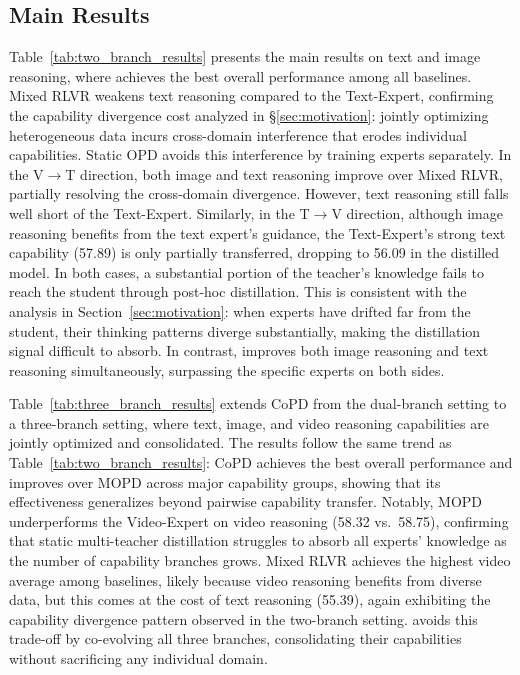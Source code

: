 \subsection{Main Results}
\label{sec:main_exps}

Table~\ref{tab:two_branch_results} presents the main results on text and image reasoning, where \method achieves the best overall performance among all baselines. Mixed RLVR weakens text reasoning compared to the Text-Expert, confirming the capability divergence cost analyzed in \S\ref{sec:motivation}: jointly optimizing heterogeneous data incurs cross-domain interference that erodes individual capabilities. Static OPD avoids this interference by training experts separately. In the V$\to$T direction, both image and text reasoning improve over Mixed RLVR, partially resolving the cross-domain divergence. However, text reasoning still falls well short of the Text-Expert. Similarly, in the T$\to$V direction, although image reasoning benefits from the text expert's guidance, the Text-Expert's strong text capability (57.89) is only partially transferred, dropping to 56.09 in the distilled model. In both cases, a substantial portion of the teacher's knowledge fails to reach the student through post-hoc distillation. This is consistent with the analysis in Section~\ref{sec:motivation}: when experts have drifted far from the student, their thinking patterns diverge substantially, making the distillation signal difficult to absorb. In contrast, \method improves both image reasoning and text reasoning simultaneously, surpassing the specific experts on both sides. 

 Table~\ref{tab:three_branch_results} extends CoPD from the dual-branch setting to a three-branch setting, where text, image, and video reasoning capabilities are jointly optimized and consolidated. The results follow the same trend as Table~\ref{tab:two_branch_results}: CoPD achieves the best overall performance and improves over MOPD across major capability groups, showing that its effectiveness generalizes beyond pairwise capability transfer. Notably, MOPD underperforms the Video-Expert on video reasoning (58.32 vs.\ 58.75), confirming that static multi-teacher distillation struggles to absorb all experts' knowledge as the number of capability branches grows. Mixed RLVR achieves the highest video average among baselines, likely because video reasoning benefits from diverse data, but this comes at the cost of text reasoning (55.39), again exhibiting the capability divergence pattern observed in the two-branch setting. \method avoids this trade-off by co-evolving all three branches, consolidating their capabilities without sacrificing any individual domain.

